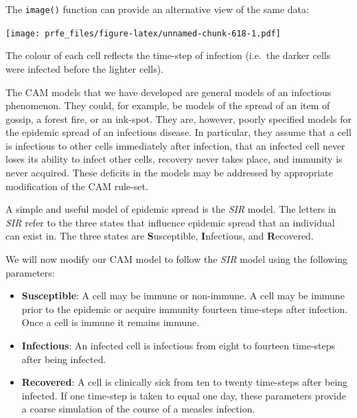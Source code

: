\documentclass[12pt,a4paper]{book}
\newenvironment{Shaded}{\begin{snugshade}}{\end{snugshade}}
\newcommand{\KeywordTok}[1]{\textcolor[rgb]{0.13,0.29,0.53}{\textbf{#1}}}
\newcommand{\DataTypeTok}[1]{\textcolor[rgb]{0.13,0.29,0.53}{#1}}
\newcommand{\OtherTok}[1]{\textcolor[rgb]{0.56,0.35,0.01}{#1}}
\newcommand{\OperatorTok}[1]{\textcolor[rgb]{0.81,0.36,0.00}{\textbf{#1}}}
\newcommand{\NormalTok}[1]{#1}
\theoremstyle{definition}
\theoremstyle{definition}
\theoremstyle{definition}
\theoremstyle{remark}
\begin{document}
The \texttt{image()} function can provide an alternative view of the
same data:

\begin{Shaded}
\end{Shaded}

\texttt{[image: prfe\_files/figure-latex/unnamed-chunk-618-1.pdf]}

The colour of each cell reflects the time-step of infection (i.e.~the
darker cells were infected before the lighter cells).

The CAM models that we have developed are general models of an
infectious phenomenon. They could, for example, be models of the spread
of an item of gossip, a forest fire, or an ink-spot. They are, however,
poorly specified models for the epidemic spread of an infectious
disease. In particular, they assume that a cell is infectious to other
cells immediately after infection, that an infected cell never loses its
ability to infect other cells, recovery never takes place, and immunity
is never acquired. These deficits in the models may be addressed by
appropriate modification of the CAM rule-set.

A simple and useful model of epidemic spread is the \emph{SIR} model.
The letters in \emph{SIR} refer to the three states that influence
epidemic spread that an individual can exist in. The three states are
\textbf{S}usceptible, \textbf{I}nfectious, and \textbf{R}ecovered.

We will now modify our CAM model to follow the \emph{SIR} model using
the following parameters:

\begin{itemize}
\item
  \textbf{Susceptible}: A cell may be immune or non-immune. A cell may
  be immune prior to the epidemic or acquire immunity fourteen
  time-steps after infection. Once a cell is immune it remains immune.
\item
  \textbf{Infectious}: An infected cell is infectious from eight to
  fourteen time-steps after being infected.
\item
  \textbf{Recovered}: A cell is clinically sick from ten to twenty
  time-steps after being infected. If one time-step is taken to equal
  one day, these parameters provide a coarse simulation of the course of
  a measles infection.
\end{itemize}
\end{document}
